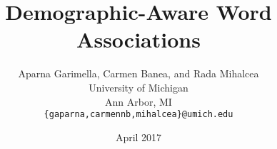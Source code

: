 \documentclass[11pt,letterpaper]{article}
\title{Demographic-Aware Word Associations}
\author{Aparna Garimella, Carmen Banea, and Rada Mihalcea \\
  University of Michigan\\Ann Arbor, MI \\
  {\tt \{gaparna,carmennb,mihalcea\}@umich.edu}}
\date{April 2017}
\newcommand{\FIXME}[1]{\textcolor{red}{#1}}
\begin{document}
\maketitle

\begin{comment}
\FIXME{Pending tasks\\
Aparna: finalize LSA-based experiments (generic and demographics-aware) - 300 latent features\\
Aparna: update evals table (link to current results \url{https://docs.google.com/spreadsheets/d/1_i68_wBFhjXexa_yeo1xNA_BoBUUeMYLwlw_EXaThpM/edit#gid=1403989193})\\

NOTE: In terms of embeddings, the quarter data is already too small, and we see significant drops between using the culture or gender dataset on one side and using the quarter dataset on the other. In addition, for quarter data there are embeddings that simply don't return anything, as they are out-of-vocabulary. So even if we encounter a couple of occurrences in the data, it is not sufficient to generalize embeddings. Further more, the embeddings that I trained exist in a mixed space (with generic words and gender tagged words); the embeddings decisions are refined over both sides of a complementary demographic, so it would be unfair to compare it with generic embeddings versions that have access to only half the data (as the small quarters data set would do).}
\end{comment}
\end{document}
